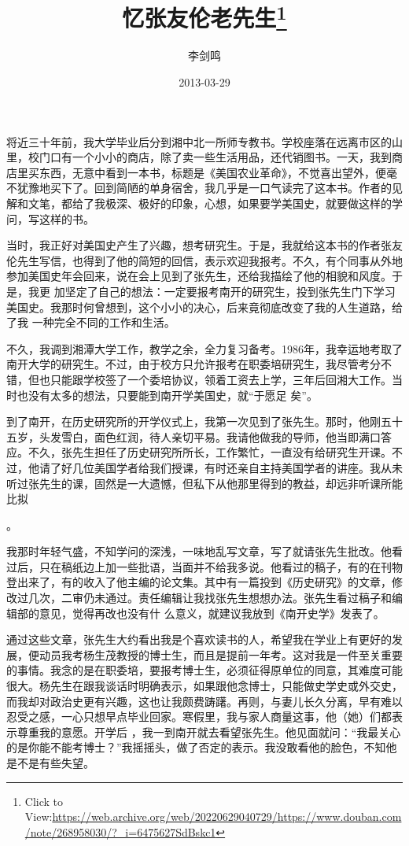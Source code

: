 \documentclass{article}
\title{忆张友伦老先生\footnote{Click to View:\url{https://web.archive.org/web/20220629040729/https://www.douban.com/note/268958030/?_i=6475627SdBskc1}}}
\author{李剑鸣}
\date{2013-03-29}
\begin{document}

\maketitle


\Large

﻿将近三十年前，我大学毕业后分到湘中北一所师专教书。学校座落在远离市区的山里，校门口有一个小小的商店，除了卖一些生活用品，还代销图书。一天，我到商店里买东西，无意中看到一本书，标题是《美国农业革命》，不觉喜出望外，便毫不犹豫地买下了。回到简陋的单身宿舍，我几乎是一口气读完了这本书。作者的见解和文笔，都给了我极深、极好的印象，心想，如果要学美国史，就要做这样的学
问，写这样的书。 

当时，我正好对美国史产生了兴趣，想考研究生。于是，我就给这本书的作者张友伦先生写信，也得到了他的简短的回信，表示欢迎我报考。不久，有个同事从外地参加美国史年会回来，说在会上见到了张先生，还给我描绘了他的相貌和风度。于是，我更
\newpage
加坚定了自己的想法：一定要报考南开的研究生，投到张先生门下学习美国史。我那时何曾想到，这个小小的决心，后来竟彻底改变了我的人生道路，给了我
一种完全不同的工作和生活。 

不久，我调到湘潭大学工作，教学之余，全力复习备考。1986年，我幸运地考取了南开大学的研究生。不过，由于校方只允许报考在职委培研究生，我尽管考分不错，但也只能跟学校签了一个委培协议，领着工资去上学，三年后回湘大工作。当时也没有太多的想法，只要能到南开学美国史，就“于愿足
矣”。 

到了南开，在历史研究所的开学仪式上，我第一次见到了张先生。那时，他刚五十五岁，头发雪白，面色红润，待人亲切平易。我请他做我的导师，他当即满口答应。不久，张先生担任了历史研究所所长，工作繁忙，一直没有给研究生开课。不过，他请了好几位美国学者给我们授课，有时还亲自主持美国学者的讲座。我从未听过张先生的课，固然是一大遗憾，但私下从他那里得到的教益，却远非听课所能比拟
\newpage

。 

我那时年轻气盛，不知学问的深浅，一味地乱写文章，写了就请张先生批改。他看过后，只在稿纸边上加一些批语，当面并不给我多说。他看过的稿子，有的在刊物登出来了，有的收入了他主编的论文集。其中有一篇投到《历史研究》的文章，修改过几次，二审仍未通过。责任编辑让我找张先生想想办法。张先生看过稿子和编辑部的意见，觉得再改也没有什
么意义，就建议我放到《南开史学》发表了。 

通过这些文章，张先生大约看出我是个喜欢读书的人，希望我在学业上有更好的发展，便动员我考杨生茂教授的博士生，而且是提前一年考。这对我是一件至关重要的事情。我念的是在职委培，要报考博士生，必须征得原单位的同意，其难度可能很大。杨先生在跟我谈话时明确表示，如果跟他念博士，只能做史学史或外交史，而我却对政治史更有兴趣，这也让我颇费踌躇。再则，与妻儿长久分离，早有难以忍受之感，一心只想早点毕业回家。寒假里，我与家人商量这事，他（她）们都表示尊重我的意愿。开学后
\newpage
，我一到南开就去看望张先生。他见面就问：“我最关心的是你能不能考博士？”我摇摇头，做了否定的表示。我没敢看他的脸色，不知他是不是有些失望。
 
\end{document}
